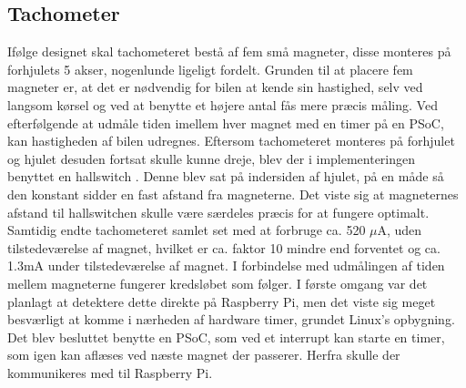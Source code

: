 \subsection{Tachometer}\label{sec:hwi_tacho}

Ifølge designet skal tachometeret bestå af fem små magneter, disse monteres på forhjulets 5 akser, nogenlunde ligeligt fordelt. 
Grunden til at placere fem magneter er, at det er nødvendig for bilen at kende sin hastighed, selv ved langsom kørsel og ved at benytte et højere antal fås mere præcis måling.
Ved efterfølgende at udmåle tiden imellem hver magnet med en timer på en PSoC, kan hastigheden af bilen udregnes.
Eftersom tachometeret monteres på forhjulet og hjulet desuden fortsat skulle kunne dreje, blev der i implementeringen benyttet en hallswitch \cite{lib:tacho}. 
Denne blev sat på indersiden af hjulet, på en måde så den konstant sidder en fast afstand fra magneterne. 
Det viste sig at magneternes afstand til hallswitchen skulle være særdeles præcis for at fungere optimalt. 
Samtidig endte tachometeret samlet set med at forbruge ca. 520 $\mu$A, uden tilstedeværelse af magnet, hvilket er ca. faktor 10 mindre end forventet og ca. 1.3mA under tilstedeværelse af magnet. 
I forbindelse med udmålingen af tiden mellem magneterne fungerer kredsløbet som følger. 
I første omgang var det planlagt at detektere dette direkte på Raspberry Pi, men det viste sig meget besværligt at komme i nærheden af hardware timer, grundet Linux's opbygning. 
Det blev  besluttet benytte en PSoC, som ved et interrupt kan starte en timer, som igen kan aflæses ved næste magnet der passerer. 
Herfra skulle der kommunikeres med \IIC til Raspberry Pi. 
 